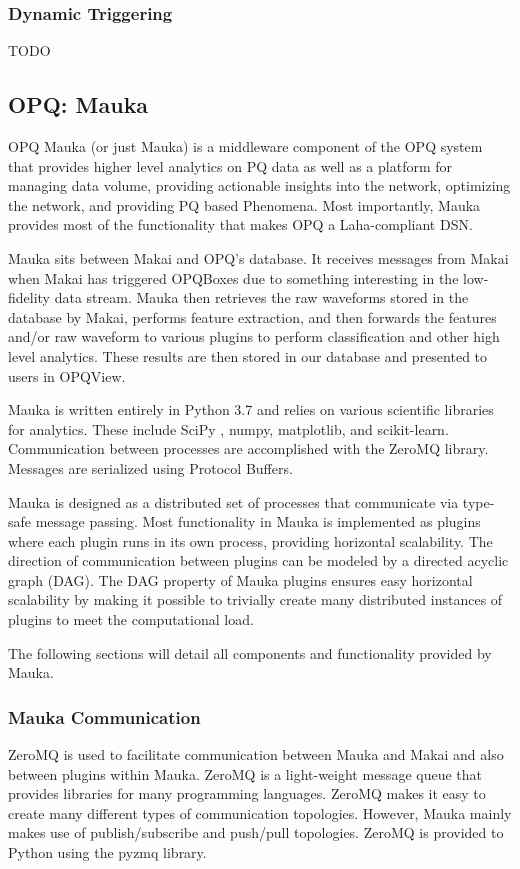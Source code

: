 \subsubsection{Dynamic Triggering}

TODO

\subsection{OPQ: Mauka}
OPQ Mauka (or just Mauka) is a middleware component of the OPQ system that provides higher level analytics on PQ data as well as a platform for managing data volume, providing actionable insights into the network, optimizing the network, and providing PQ based Phenomena. Most importantly, Mauka provides most of the functionality that makes OPQ a Laha-compliant DSN.

Mauka sits between Makai and OPQ's database. It receives messages from Makai when Makai has triggered OPQBoxes due to something interesting in the low-fidelity data stream. Mauka then retrieves the raw waveforms stored in the database by Makai, performs feature extraction, and then forwards the features and/or raw waveform to various plugins to perform classification and other high level analytics. These results are then stored in our database and presented to users in OPQView.

Mauka is written entirely in Python 3.7\cite{python:2019} and relies on various scientific libraries for analytics. These include SciPy \cite{scipy:2019}, numpy\cite{numpy}, matplotlib\cite{matplotlib}, and scikit-learn\cite{scikitlearn}. Communication between processes are accomplished with the ZeroMQ\cite{zmq} library. Messages are serialized using Protocol Buffers\cite{protobuf}.

Mauka is designed as a distributed set of processes that communicate via type-safe message passing. Most functionality in Mauka is implemented as plugins where each plugin runs in its own process, providing horizontal scalability. The direction of communication between plugins can be modeled by a directed acyclic graph (DAG). The DAG property of Mauka plugins ensures easy horizontal scalability by making it possible to trivially create many distributed instances of plugins to meet the computational load. 

The following sections will detail all components and functionality provided by Mauka.

\subsubsection{Mauka Communication}
ZeroMQ is used to facilitate communication between Mauka and Makai and also between plugins within Mauka. ZeroMQ is a light-weight message queue that provides libraries for many programming languages. ZeroMQ makes it easy to create many different types of communication topologies. However, Mauka mainly makes use of publish/subscribe and push/pull topologies. ZeroMQ is provided to Python using the pyzmq library.

